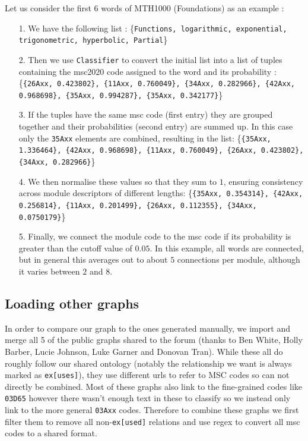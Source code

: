 \documentclass[english, 12pt]{article}
\begin{document}
Let us consider the first 6 words of MTH1000 (Foundations) as an example :
\begin{itemize}
\item[1.] We have the following list : 
\{\texttt{Functions, logarithmic, exponential, trigonometric, hyperbolic, Partial}\}
\item[2.] Then we use \texttt{Classifier} to convert the initial list into a list of tuples containing the msc2020 code assigned to the word and its probability : 
\{\texttt{\{26Axx, 0.423802\}, \{11Axx, 0.760049\}, \{34Axx, 0.282966\}, \{42Axx, 0.968698\}, \{35Axx, 0.994287\}, \{35Axx, 0.342177\}}\}
\item[3.] If the tuples have the same msc code (first entry) they are grouped together and their probabilities (second entry) are summed up. In this case only the \texttt{35Axx} elements are combined, resulting in the list: \{\texttt{\{35Axx, 1.336464\}, \{42Axx, 0.968698\}, \{11Axx, 0.760049\}, \{26Axx, 0.423802\}, \{34Axx, 0.282966\}}\}
	\item[4.] We then normalise these values so that they sum to $1$, ensuring consistency across module descriptors of different lengths: \{\texttt{\{35Axx, 0.354314\}, \{42Axx, 0.256814\}, \{11Axx, 0.201499\}, \{26Axx, 0.112355\}, \{34Axx, 0.0750179\}}\}
   	\item[5.] Finally, we connect the module code to the msc code if its probability is greater than the cutoff value of $0.05$. In this example, all words are connected, but in general this averages out to about $5$ connections per module, although it varies between $2$ and $8$. 
\end{itemize}

\subsection{Loading other graphs}
In order to compare our graph to the ones generated manually, we import and merge all 5 of the public graphs shared to the forum (thanks to Ben White, Holly Barber, Lucie Johnson, Luke Garner and Donovan Tran). While these all do roughly follow our shared ontology (notably the relationship we want is always marked as \texttt{ex[uses]}), they use different urls to refer to MSC codes so can not directly be combined. Most of these graphs also link to the fine-grained codes like \texttt{03D65} however there wasn't enough text in these to classify so we instead only link to the more general \texttt{03Axx} codes. Therefore to combine these graphs we first filter them to remove all non-\texttt{ex[used]} relations and use regex to convert all msc codes to a shared format.
\end{document}
